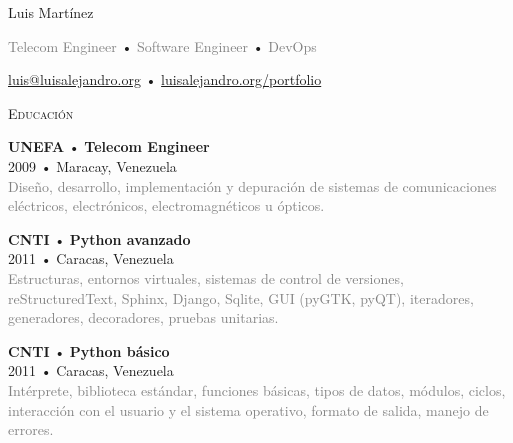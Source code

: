 \documentclass[12pt]{article}
\begin{document}
\centering
\begin{cv}{Luis Mart\'inez}
  
  \vspace{0.25em}
  \textcolor{gray}{Telecom Engineer} •
  \textcolor{gray}{Software Engineer} •
  \textcolor{gray}{DevOps}

  \vspace{0.125em}
  \href{mailto:luis@luisalejandro.org}{luis@luisalejandro.org} •
  \href{https://luisalejandro.org/portfolio}{luisalejandro.org/portfolio}
  \vspace{0.125em}

  \hrulefill

  \begin{minipage}[t]{0.35\textwidth}
    \vspace{0.125em}
    
    \begin{minipage}{\linewidth}
      \textrm{\textsc{\Large{Educación}}}
      \newline
      \parbox[t]{\linewidth}{
        \textbf{UNEFA} • \textrm{\textbf{Telecom Engineer}}\\
        2009 • Maracay, Venezuela\\
        \footnotesize{\textcolor{gray}{Diseño, desarrollo, implementación y depuración de sistemas de comunicaciones eléctricos, electrónicos, electromagnéticos u ópticos.}}\\
      }
      \newline
      \parbox[t]{\linewidth}{
        \textbf{CNTI} • \textrm{\textbf{Python avanzado}}\\
        2011 • Caracas, Venezuela\\
        \footnotesize{\textcolor{gray}{Estructuras, entornos virtuales, sistemas de control de versiones, reStructuredText, Sphinx, Django, Sqlite, GUI (pyGTK, pyQT), iteradores, generadores, decoradores, pruebas unitarias.}}\\
      }
      \newline
      \parbox[t]{\linewidth}{
        \textbf{CNTI} • \textrm{\textbf{Python básico}}\\
        2011 • Caracas, Venezuela\\
        \footnotesize{\textcolor{gray}{Intérprete, biblioteca estándar, funciones básicas, tipos de datos, módulos, ciclos, interacción con el usuario y el sistema operativo, formato de salida, manejo de errores.}}\\
      }
      \newline
    \end{minipage}


\end{minipage}
\end{cv}
\end{document}
